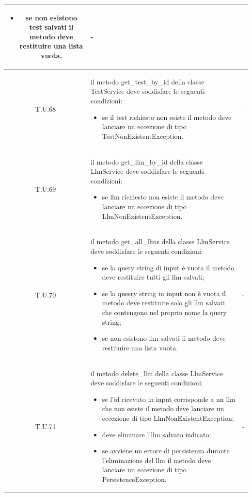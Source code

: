 \begin{tabularx}{\textwidth}{|c|X|c|}
\begin{itemize}
        \item se non esistono test salvati il metodo deve restituire una lista vuota.
    \end{itemize} & - \\
    \hline 
    \label{tu:tu68} T.U.68 & il metodo get\_test\_by\_id della classe TestService deve soddisfare le seguenti condizioni:
    \begin{itemize}
        \item se il test richiesto non esiste il metodo deve lanciare un eccezione di tipo TestNonExistentException.
    \end{itemize} & - \\
    \hline 
    \label{tu:tu69} T.U.69 & il metodo get\_llm\_by\_id della classe LlmService deve soddisfare le seguenti condizioni:
    \begin{itemize}
        \item se llm richiesto non esiste il metodo deve lanciare un eccezione di tipo LlmNonExistentException.
    \end{itemize} & - \\
    \hline 
    \label{tu:tu70} T.U.70 & il metodo get\_all\_llms della classe LlmService deve soddisfare le seguenti condizioni: 
    \begin{itemize}
        \item se la query string di input è vuota il metodo deve restituire tutti gli llm salvati;
        \item se la quesry string in input non è vuota il metodo deve restituire solo gli llm salvati che contengono nel proprio nome la query string;
        \item se non esistono llm salvati il metodo deve restituire una lista vuota.
    \end{itemize} & - \\
    \hline 
    \label{tu:tu71} T.U.71 & il metodo delete\_llm della classe LlmService deve soddisfare le seguenti condizioni:
    \begin{itemize}
        \item se l'id ricevuto in input corrisponde a un llm che non esiste il metodo deve lanciare un eccezione di tipo LlmNonExistentException;
        \item deve eliminare l'llm salvato indicato;
        \item se avviene un errore di persistenza durante l'eliminazione del llm il metodo deve lanciare un eccezione di tipo PersistenceException.
    \end{itemize} & - \\

\end{tabularx}
